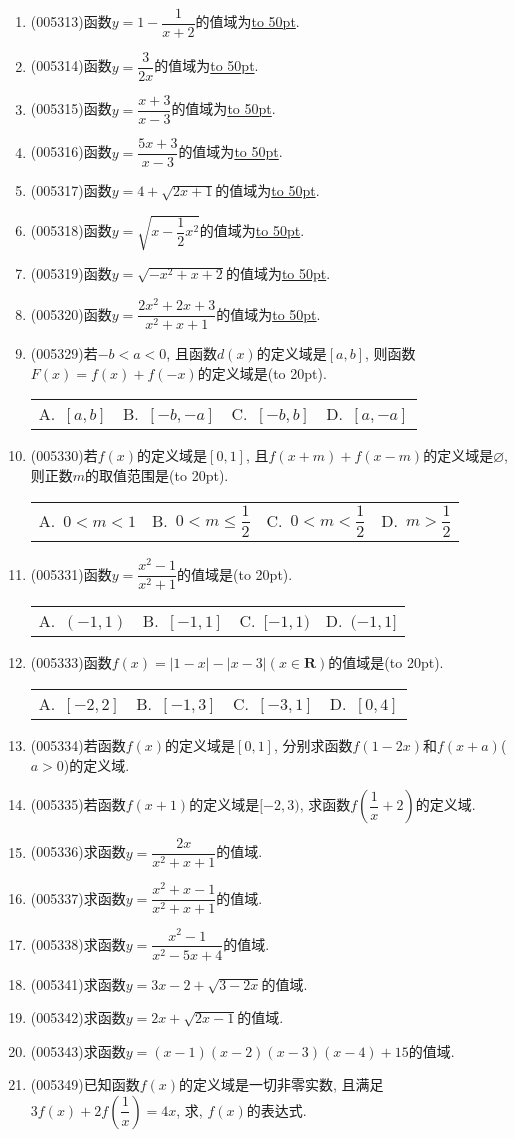 \documentclass[10pt,a4paper]{article}
\newcommand{\blank}[1]{\underline{\hbox to #1pt{}}}
\newcommand{\bracket}[1]{(\hbox to #1pt{})}
\newcommand{\fourch}[4]{\par\begin{tabular}{p{.23\textwidth}p{.23\textwidth}p{.23\textwidth}p{.23\textwidth}}
A.~#1 &B.~#2& C.~#3& D.~#4
\end{tabular}}
\begin{document}
\begin{enumerate}[1.]
\item {\tiny (005313)}函数$y=1-\dfrac 1{x+2}$的值域为\blank{50}.
\item {\tiny (005314)}函数$y=\dfrac 3{2x}$的值域为\blank{50}.
\item {\tiny (005315)}函数$y=\dfrac{x+3}{x-3}$的值域为\blank{50}.
\item {\tiny (005316)}函数$y=\dfrac{5x+3}{x-3}$的值域为\blank{50}.
\item {\tiny (005317)}函数$y=4+\sqrt {2x+1}$的值域为\blank{50}.
\item {\tiny (005318)}函数$y=\sqrt {x-\dfrac 12x^2}$的值域为\blank{50}.
\item {\tiny (005319)}函数$y=\sqrt {-x^2+x+2}$的值域为\blank{50}.
\item {\tiny (005320)}函数$y=\dfrac{2x^2+2x+3}{x^2+x+1}$的值域为\blank{50}.
\item {\tiny (005329)}若$-b<a<0$, 且函数$d(x)$的定义域是$[a,b]$, 则函数$F(x)=f(x)+f(-x)$的定义域是\bracket{20}.
\fourch{$[a,b]$}{$[-b,-a]$}{$[-b,b]$}{$[a,-a]$}
\item {\tiny (005330)}若$f(x)$的定义域是$[ 0,1 ]$, 且$f(x+m)+f(x-m)$的定义域是$\varnothing$, 则正数$m$的取值范围是\bracket{20}.
\fourch{$0<m<1$}{$0<m\le \dfrac 12$}{$0<m<\dfrac 12$}{$m>\dfrac 12$}
\item {\tiny (005331)}函数$y=\dfrac{x^2-1}{x^2+1}$的值域是\bracket{20}.
\fourch{$(-1,1)$}{$[-1,1]$}{$[-1,1)$}{$(-1,1]$}
\item {\tiny (005333)}函数$f(x)=|1-x|-|x-3|(x\in \mathbf{R})$的值域是\bracket{20}.
\fourch{$[-2,2]$}{$[-1,3]$}{$[-3,1]$}{$[0,4]$}
\item {\tiny (005334)}若函数$f(x)$的定义域是$[0,1]$, 分别求函数$f(1-2x)$和$f(x+a)$($a>0$)的定义域.
\item {\tiny (005335)}若函数$f(x+1)$的定义域是$[-2,3)$, 求函数$f(\dfrac 1x+2)$的定义域.
\item {\tiny (005336)}求函数$y=\dfrac{2x}{x^2+x+1}$的值域.
\item {\tiny (005337)}求函数$y=\dfrac{x^2+x-1}{x^2+x+1}$的值域.
\item {\tiny (005338)}求函数$y=\dfrac{x^2-1}{x^2-5x+4}$的值域.
\item {\tiny (005341)}求函数$y=3x-2+\sqrt {3-2x}$的值域.
\item {\tiny (005342)}求函数$y=2x+\sqrt {2x-1}$的值域.
\item {\tiny (005343)}求函数$y=(x-1)(x-2)(x-3)(x-4)+15$的值域.
\item {\tiny (005349)}已知函数$f(x)$的定义域是一切非零实数, 且满足$3f(x)+2f(\dfrac 1x)=4x$, 求, $f(x)$的表达式.

\end{enumerate}
\end{document}
